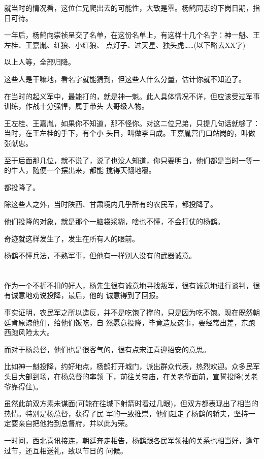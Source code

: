\documentclass[11pt,a4paper,onecolumn]{article}
\begin{document}
就当时的情况看，这位仁兄爬出去的可能性，大致是零。杨鹤同志的下岗日期，指日可待。

一年后，杨鹤向崇祯呈交了名单，在这份名单上，有这样十几个名字：神一魁、王左桂、王嘉胤、红狼、小红狼、
点灯子、过天星、独头虎……(以下略去XX字)

以上人等，全部归降。

这些人是干嘛地，看名字就能猜到，但这些人什么分量，估计你就不知道了。

在当时的起义军中，最能打的，就是神一魁。此人具体情况不详，但应该受过军事训练，作战十分强悍，属于带头
大哥级人物。

王左桂、王嘉胤，如果你不知道，那不怪你。对这二位兄弟，只提几句话就够了：当时，在王左桂的手下，有个小
头目，叫做李自成。王嘉胤营门口站岗的，叫做张献忠。

至于后面那几位，就不说了，说了也没人知道，你只要明白，他们都是当时一等一的牛人，随便一个摆出来，都能
搅得天翻地覆。

都投降了。

除这些人之外，当时陕西、甘肃境内几乎所有的农民军，都投降了。

他们投降的对象，就是那个一脑袋浆糊，啥也不懂，不会打仗的杨鹤。

奇迹就这样发生了，发生在所有人的眼前。

杨鹤不懂兵法，不熟军事，但他有一样别人没有的武器\myrule 诚意。

\section[\thesection]{}

作为一个不折不扣的好人，杨先生很有诚意地寻找叛军，很有诚意地进行谈判，很有诚意地劝说投降，最后，他的
诚意得到了回报。

事实证明，农民军之所以造反，并不是吃饱了撑的，只是因为吃不饱。现在既然朝廷肯原谅他们，给他们饭吃，自
然愿意投降，毕竟造反这事，要经常出差，东跑西跑风险太大。

而对于杨总督，他们也是很客气的，很有点宋江喜迎招安的意思。

比如神一魁投降，约好地点，杨鹤打开城门，派出群众代表，热烈欢迎。众多民军头目大部到场，在杨总督的率领
下，前往关帝庙，在关老爷面前，宣誓投降(关老爷靠得住)。

虽然此前双方素未谋面(可能在往城下射箭时看过几眼)，但双方都表现出了相当的热情。特别是杨总督，获得了民
军的一致推崇，他们赶走了杨鹤的轿夫，坚持一定要亲自把他抬到总督府，并以此为荣。

一时间，西北喜讯接连，朝廷奔走相告，杨鹤跟各民军领袖的关系也相当好，逢年过节，还互相送礼，致以节日的
问候。
\end{document}
